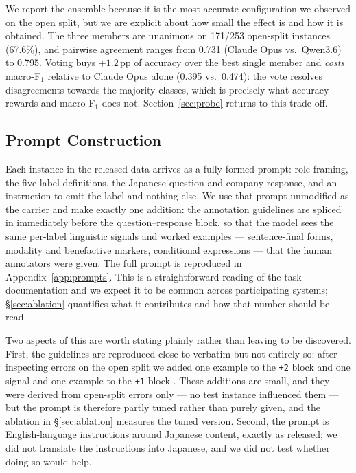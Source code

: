 We report the ensemble because it is the most accurate configuration we
observed on the open split, but we are explicit about how small the
effect is and how it is obtained. The three members are unanimous on
171/253 open-split instances (67.6\%), and pairwise agreement ranges
from 0.731 (Claude Opus vs.\ Qwen3.6) to 0.795. Voting buys
$+1.2$\,pp of accuracy over the best single member and \emph{costs}
macro-F$_1$ relative to Claude Opus alone (0.395 vs.\ 0.474): the vote
resolves disagreements towards the majority classes, which is precisely
what accuracy rewards and macro-F$_1$ does not. Section~\ref{sec:probe}
returns to this trade-off.

\subsection{Prompt Construction}
\label{sec:prompt}

Each instance in the released data arrives as a fully formed prompt:
role framing, the five label definitions, the Japanese question and
company response, and an instruction to emit the label and nothing
else. We use that prompt unmodified as the carrier and make exactly one
addition: the annotation guidelines are spliced in immediately before
the question--response block, so that the model sees the same
per-label linguistic signals and worked examples --- sentence-final
forms, modality and benefactive markers, conditional expressions ---
that the human annotators were given. The full prompt is reproduced in
Appendix~\ref{app:prompts}. This is a straightforward reading of the
task documentation and we expect it to be common across participating
systems; \S\ref{sec:ablation} quantifies what it contributes and how
that number should be read.

Two aspects of this are worth stating plainly rather than leaving to be
discovered. First, the guidelines are reproduced close to verbatim but
not entirely so: after inspecting errors on the open split we added one
example to the \texttt{+2} block and one signal and one example to the
\texttt{+1} block . These additions are small, and
they were derived from open-split errors only --- no test instance
influenced them --- but the prompt is therefore partly tuned rather
than purely given, and the ablation in \S\ref{sec:ablation} measures
the tuned version. Second, the prompt is English-language instructions
around Japanese content, exactly as released; we did not translate the
instructions into Japanese, and we did not test whether doing so would
help.

